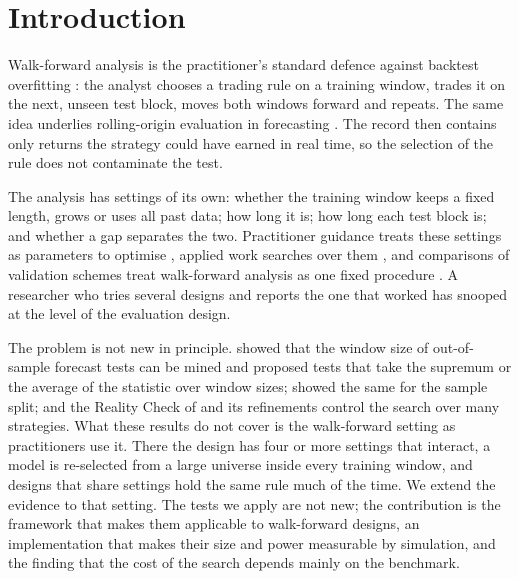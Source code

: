 \documentclass[pdflatex,sn-basic]{sn-jnl}
\theoremstyle{thmstyleone}
\theoremstyle{thmstylethree}
\begin{document}

\maketitle

\section{Introduction}\label{sec:intro}

Walk-forward analysis is the practitioner's standard defence against backtest overfitting
\citep{pardo2008}: the analyst chooses a trading rule on a training window, trades it on the next,
unseen test block, moves both windows forward and repeats. The same idea underlies rolling-origin
evaluation in forecasting \citep{tashman2000,hyndman2021}. The record then contains only returns the
strategy could have earned in real time, so the selection of the rule does not contaminate the test.

The analysis has settings of its own: whether the training window keeps a fixed length, grows or uses
all past data; how long it is; how long each test block is; and whether a gap separates the two.
Practitioner guidance treats these settings as parameters to optimise \citep{pardo2008}, applied work
searches over them \citep[for example][]{mroziewicz2026}, and comparisons of validation schemes treat
walk-forward analysis as one fixed procedure \citep{arian2024}. A researcher who tries several designs
and reports the one that worked has snooped at the level of the evaluation design.

The problem is not new in principle. \citet{rossi2012} showed that the window size of out-of-sample
forecast tests can be mined and proposed tests that take the supremum or the average of the statistic
over window sizes; \citet{hansen2012split} showed the same for the sample split; and the Reality Check
of \citet{white2000} and its refinements \citep{hansen2005,romano2005} control the search over many
strategies. What these results do not cover is the walk-forward setting as practitioners use it. There
the design has four or more settings that interact, a model is re-selected from a large universe inside
every training window, and designs that share settings hold the same rule much of the time. We extend
the evidence to that setting. The tests we apply are not new; the contribution is the framework that
makes them applicable to walk-forward designs, an implementation that makes their size and power
measurable by simulation, and the finding that the cost of the search depends mainly on the benchmark.
\end{document}

